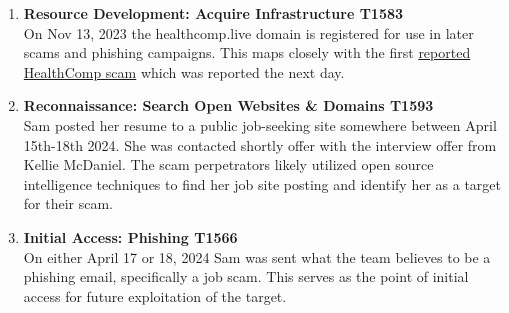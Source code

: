 \begin{fullwidth}
\begin{enumerate}
    \item \textbf{Resource Development: Acquire Infrastructure T1583}
            \\\medskip On Nov 13, 2023 the healthcomp.live domain is registered for use in later scams and phishing campaigns. This maps closely with the first \hyperref[sec:BBB Scam Report]{reported HealthComp scam} which was reported the next day.
    \item \textbf{Reconnaissance: Search Open Websites \& Domains T1593}
            \\\medskip Sam posted her resume to a public job-seeking site somewhere between April 15th-18th 2024. She was contacted shortly offer with the interview offer from Kellie McDaniel. The scam perpetrators likely utilized open source intelligence techniques to find her job site posting and identify her as a target for their scam.
    \item \textbf{Initial Access: Phishing T1566}
            \\\medskip On either April 17 or 18, 2024 Sam was sent what the team believes to be a phishing email, specifically a job scam. This serves as the point of initial access for future exploitation of the target.
\end{enumerate}

\end{fullwidth}